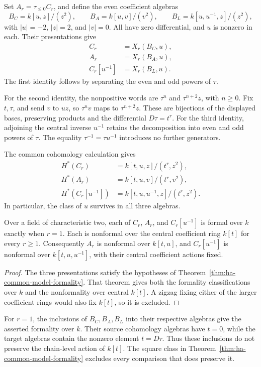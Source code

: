 Set $A_r=\tau_{\leq0}C_r$, and define the even coefficient algebras
\[
 B_C=k[u,z]/(z^2),\qquad B_A=k[u,v]/(v^2),\qquad
 B_L=k[u,u^{-1},z]/(z^2),
\]
with $|u|=-2$, $|z|=2$, and $|v|=0$.
All have zero differential, and $u$ is nonzero in each.
Their presentations give
\[
 \begin{split}
 C_r&=X_r(B_C,u),\\
 A_r&=X_r(B_A,u),\\
 C_r[u^{-1}]&=X_r(B_L,u).
 \end{split}
\]
The first identity follows by separating the even and odd powers
of $\tau$.

For the second identity, the nonpositive words are $\tau^n$ and
$\tau^{n+2}z$, with $n\geq0$.
Fix $t,\tau$, and send $v$ to $uz$, so $\tau^nv$ maps to $\tau^{n+2}z$.
These are bijections of the displayed bases, preserving products and
the differential $D\tau=t^r$.
For the third identity, adjoining the central inverse $u^{-1}$
retains the decomposition into even and odd powers of $\tau$.
The equality $\tau^{-1}=\tau u^{-1}$ introduces no further generators.

The common cohomology calculation gives
\[
 \begin{split}
 H^*(C_r)&=k[t,u,z]/(t^r,z^2),\\
 H^*(A_r)&=k[t,u,v]/(t^r,v^2),\\
 H^*(C_r[u^{-1}])&=k[t,u,u^{-1},z]/(t^r,z^2).
 \end{split}
\]
In particular, the class of $u$ survives in all three algebras.

\begin{theorem}\label{thm:ha-characteristic-two}
Over a field of characteristic two, each of $C_r$, $A_r$, and
$C_r[u^{-1}]$ is formal over $k$ exactly when $r=1$.
Each is nonformal over the central coefficient ring $k[t]$ for
every $r\geq1$.
Consequently $A_r$ is nonformal over $k[t,u]$, and
$C_r[u^{-1}]$ is nonformal over $k[t,u,u^{-1}]$, with their central
coefficient actions fixed.
\end{theorem}

\begin{proof}
The three presentations satisfy the hypotheses of
Theorem~\ref{thm:ha-common-model-formality}.
That theorem gives both the formality classifications over $k$ and
the nonformality over central $k[t]$.
A zigzag fixing either of the larger coefficient rings would also
fix $k[t]$, so it is excluded.
\end{proof}

For $r=1$, the inclusions of $B_C,B_A,B_L$ into their respective
algebras give the asserted formality over $k$.
Their source cohomology algebras have $t=0$, while the target
algebras contain the nonzero element $t=D\tau$.
Thus these inclusions do not preserve the chain-level action of $k[t]$.
The square class in Theorem~\ref{thm:ha-common-model-formality}
excludes every comparison that does preserve it.

